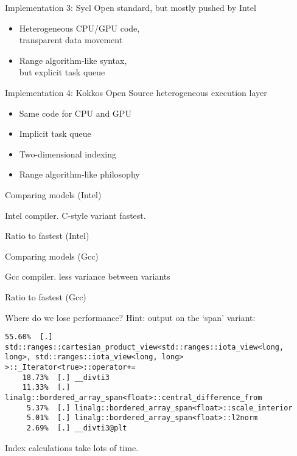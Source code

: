 \documentclass[10pt,t]{beamer}
\begin{document}
\begin{frame}[containsverbatim]{Implementation 3: Sycl}
  Open standard, but mostly pushed by Intel
  \begin{itemize}
  \item Heterogeneous CPU/GPU code,\\
    transparent data movement
  \item Range algorithm-like syntax,\\
    but explicit task queue
  \end{itemize}
\end{frame}

\begin{frame}[containsverbatim]{Implementation 4: Kokkos}
  Open Source heterogeneous execution layer
  \begin{itemize}
  \item Same code for CPU and GPU
  \item Implicit task queue
  \item Two-dimensional indexing
  \item Range algorithm-like philosophy
  \end{itemize}
\end{frame}

\begin{frame}[containsverbatim]{Comparing models (Intel)}
  

  Intel compiler. C-style variant fastest.
\end{frame}

\begin{frame}[containsverbatim]{Ratio to fastest (Intel)}
  
\end{frame}

\begin{frame}[containsverbatim]{Comparing models (Gcc)}
  

  Gcc compiler. less variance between variants
\end{frame}

\begin{frame}[containsverbatim]{Ratio to fastest (Gcc)}
  
\end{frame}

\begin{frame}[containsverbatim]{Where do we lose performance?}
  Hint:  output on the `span' variant:
\begin{lstlisting}[language=verbatim]
    55.60%  [.] std::ranges::cartesian_product_view<std::ranges::iota_view<long, long>, std::ranges::iota_view<long, long> >::_Iterator<true>::operator+=
    18.73%  [.] __divti3
    11.33%  [.] linalg::bordered_array_span<float>::central_difference_from
     5.37%  [.] linalg::bordered_array_span<float>::scale_interior
     5.01%  [.] linalg::bordered_array_span<float>::l2norm
     2.69%  [.] __divti3@plt
\end{lstlisting}
Index calculations take lots of time.
\end{frame}
\end{document}
